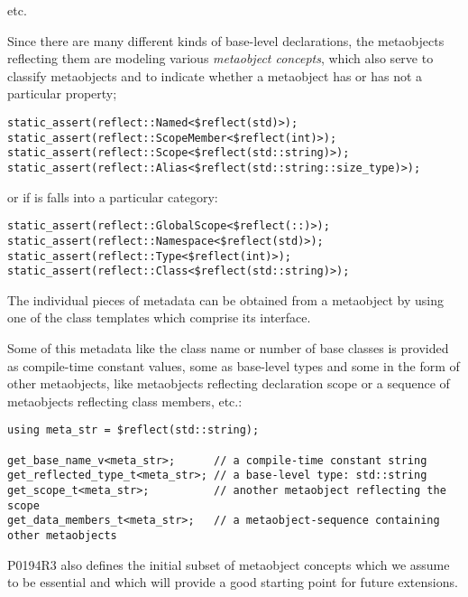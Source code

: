 etc.

Since there are many different kinds of
base-level declarations, the metaobjects reflecting them are
modeling various {\em metaobject concepts}, which also serve to classify
metaobjects and to indicate whether a metaobject has or has not a particular
property;

\begin{verbatim}
static_assert(reflect::Named<$reflect(std)>);
static_assert(reflect::ScopeMember<$reflect(int)>);
static_assert(reflect::Scope<$reflect(std::string)>);
static_assert(reflect::Alias<$reflect(std::string::size_type)>);
\end{verbatim}

or if is falls into a particular category:

\begin{verbatim}
static_assert(reflect::GlobalScope<$reflect(::)>);
static_assert(reflect::Namespace<$reflect(std)>);
static_assert(reflect::Type<$reflect(int)>);
static_assert(reflect::Class<$reflect(std::string)>);
\end{verbatim}

The individual pieces of metadata can be obtained from a metaobject by using one
of the class templates which comprise its interface.

Some of this metadata like the class name or number of base classes is provided
as compile-time constant values, some as base-level types
and some in the form of other metaobjects, like metaobjects
reflecting declaration scope or a sequence of metaobjects reflecting class members,
etc.:

\begin{verbatim}
using meta_str = $reflect(std::string);

get_base_name_v<meta_str>;      // a compile-time constant string
get_reflected_type_t<meta_str>; // a base-level type: std::string
get_scope_t<meta_str>;          // another metaobject reflecting the scope
get_data_members_t<meta_str>;   // a metaobject-sequence containing other metaobjects
\end{verbatim}

P0194R3 also defines the initial subset
of metaobject concepts which we assume to be essential
and which will provide a good starting point for future extensions.

